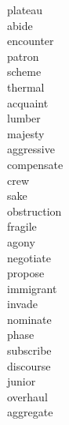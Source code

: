 \documentclass[a4paper, 10pt]{ctexart}
\begin{document}
\begin{multicols*}{2}
\begin{description}
\item[plateau]

\item[abide]

\item[encounter]

\item[patron]

\item[scheme]

\item[thermal]

\item[acquaint]

\item[lumber]

\item[majesty]

\item[aggressive]

\item[compensate]

\item[crew]

\item[sake]

\item[obstruction]

\item[fragile]

\item[agony]

\item[negotiate]

\item[propose]

\item[immigrant]

\item[invade]

\item[nominate]

\item[phase]

\item[subscribe]

\item[discourse]

\item[junior]

\item[overhaul]

\item[aggregate]


\end{description}
\end{multicols*}
\end{document}
